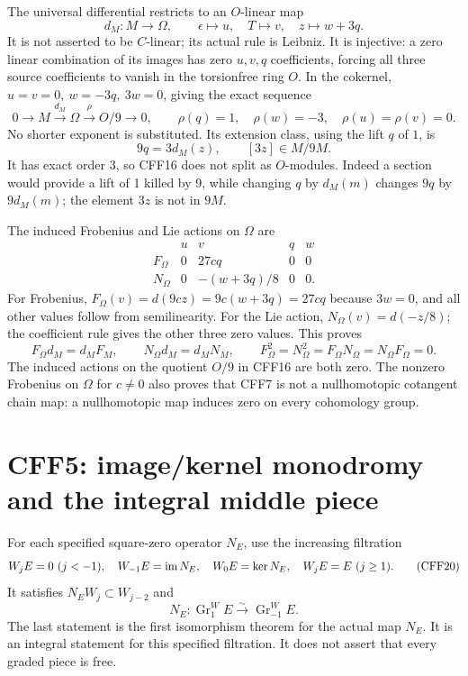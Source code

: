 The universal differential restricts to an \(O\)-linear map
\[
 d_M:M\longrightarrow\Omega,\qquad
 \epsilon\mapsto u,\quad T\mapsto v,\quad z\mapsto w+3q.
 \tag{CFF15}
\]
It is not asserted to be \(C\)-linear; its actual rule is Leibniz.
It is injective: a zero linear combination of its images has zero
\(u,v,q\) coefficients, forcing all three source coefficients to
vanish in the torsionfree ring \(O\).
In the cokernel, \(u=v=0,\ w=-3q,\ 3w=0\), giving the exact sequence
\[
 0\longrightarrow M\xrightarrow{d_M}\Omega
   \xrightarrow{\rho}O/9\longrightarrow0,\qquad
 \rho(q)=1,\quad\rho(w)=-3,\quad\rho(u)=\rho(v)=0 .
 \tag{CFF16}
\]
No shorter exponent is substituted. Its extension class, using the
lift \(q\) of \(1\), is
\[
                   9q=3d_M(z),\qquad [3z]\in M/9M.
 \tag{CFF17}
\]
It has exact order 3, so CFF16 does not split as \(O\)-modules.
Indeed a section would provide a lift of 1 killed by 9, while
changing \(q\) by \(d_M(m)\) changes \(9q\) by \(9d_M(m)\);
the element \(3z\) is not in \(9M\).

The induced Frobenius and Lie actions on \(\Omega\) are
\[
 \begin{array}{c|rrrr}
       &u&v&q&w\\ \hline
 F_\Omega&0&27cq&0&0\\
 N_\Omega&0&-(w+3q)/8&0&0 .
 \end{array}
 \tag{CFF18}
\]
For Frobenius, \(F_\Omega(v)=d(9cz)=9c(w+3q)=27cq\)
because \(3w=0\), and all other values follow from semilinearity.
For the Lie action, \(N_\Omega(v)=d(-z/8)\);
the coefficient rule gives the other three zero values.
This proves
\[
 F_\Omega d_M=d_MF_M,\qquad N_\Omega d_M=d_MN_M,\qquad
 F_\Omega^2=N_\Omega^2=F_\Omega N_\Omega=N_\Omega F_\Omega=0.
 \tag{CFF19}
\]
The induced actions on the quotient \(O/9\) in CFF16 are both zero.
The nonzero Frobenius on \(\Omega\) for \(c\ne0\) also proves
that CFF7 is not a nullhomotopic cotangent chain map: a
nullhomotopic map induces zero on every cohomology group.

\section{CFF5: image/kernel monodromy and the integral middle piece}
For each specified square-zero operator \(N_E\), use the increasing
filtration
\[
 W_jE=0\ (j<-1),\quad W_{-1}E=\im N_E,\quad
 W_0E=\ker N_E,\quad W_jE=E\ (j\ge1).
 \tag{CFF20}
\]
It satisfies \(N_EW_j\subset W_{j-2}\) and
\[
 N_E:\operatorname{Gr}^W_1 E\xrightarrow{\sim}
                  \operatorname{Gr}^W_{-1}E .
 \tag{CFF21}
\]
The last statement is the first isomorphism theorem for the actual
map \(N_E\). It is an integral statement for this specified
filtration. It does not assert that every graded piece is free.


